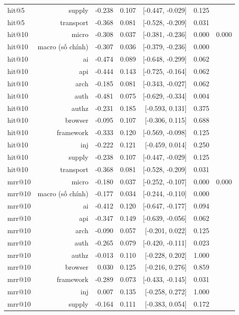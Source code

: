 \begin{table}[ht]
\begin{tabular}{lrrrrrr}
hit@5 & supply & -0.238 & 0.107 & [-0.447, -0.029] & 0.125 &  \\
hit@5 & transport & -0.368 & 0.081 & [-0.528, -0.209] & 0.031 &  \\
hit@10 & micro & -0.308 & 0.037 & [-0.381, -0.236] & 0.000 & 0.000 \\
hit@10 & macro (số chính) & -0.307 & 0.036 & [-0.379, -0.236] & 0.000 &  \\
hit@10 & ai & -0.474 & 0.089 & [-0.648, -0.299] & 0.062 &  \\
hit@10 & api & -0.444 & 0.143 & [-0.725, -0.164] & 0.062 &  \\
hit@10 & arch & -0.185 & 0.081 & [-0.343, -0.027] & 0.062 &  \\
hit@10 & auth & -0.481 & 0.075 & [-0.629, -0.334] & 0.004 &  \\
hit@10 & authz & -0.231 & 0.185 & [-0.593, 0.131] & 0.375 &  \\
hit@10 & browser & -0.095 & 0.107 & [-0.306, 0.115] & 0.688 &  \\
hit@10 & framework & -0.333 & 0.120 & [-0.569, -0.098] & 0.125 &  \\
hit@10 & inj & -0.222 & 0.121 & [-0.459, 0.014] & 0.250 &  \\
hit@10 & supply & -0.238 & 0.107 & [-0.447, -0.029] & 0.125 &  \\
hit@10 & transport & -0.368 & 0.081 & [-0.528, -0.209] & 0.031 &  \\
mrr@10 & micro & -0.180 & 0.037 & [-0.252, -0.107] & 0.000 & 0.000 \\
mrr@10 & macro (số chính) & -0.177 & 0.034 & [-0.244, -0.110] & 0.000 &  \\
mrr@10 & ai & -0.412 & 0.120 & [-0.647, -0.177] & 0.094 &  \\
mrr@10 & api & -0.347 & 0.149 & [-0.639, -0.056] & 0.062 &  \\
mrr@10 & arch & -0.090 & 0.057 & [-0.201, 0.022] & 0.125 &  \\
mrr@10 & auth & -0.265 & 0.079 & [-0.420, -0.111] & 0.023 &  \\
mrr@10 & authz & -0.013 & 0.110 & [-0.228, 0.202] & 1.000 &  \\
mrr@10 & browser & 0.030 & 0.125 & [-0.216, 0.276] & 0.859 &  \\
mrr@10 & framework & -0.289 & 0.073 & [-0.433, -0.145] & 0.031 &  \\
mrr@10 & inj & 0.007 & 0.135 & [-0.258, 0.272] & 1.000 &  \\
mrr@10 & supply & -0.164 & 0.111 & [-0.383, 0.054] & 0.172 &  \\

\end{tabular}
\end{table}
